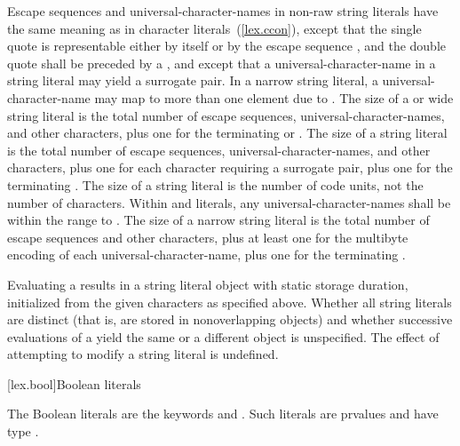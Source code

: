 \pnum
{}%
Escape sequences and universal-character-names in non-raw string literals
have the same meaning as in character literals~(\ref{lex.ccon}), except that
the single quote  is representable either by itself or by the escape sequence
, and the double quote  shall be preceded by a
\tcode{\textbackslash},
and except that a universal-character-name in a
 string literal may yield a surrogate pair.
%
In a narrow string literal, a universal-character-name may map to more
than one  element due to . The
size of a  or wide string literal is the total number of
escape sequences, universal-character-names, and other characters, plus
one for the terminating  or
. The size of a  string
literal is the total number of escape sequences,
universal-character-names, and other characters, plus one for each
character requiring a surrogate pair, plus one for the terminating
. \enternote The size of a 
string literal is the number of code units, not the number of
characters. \exitnote Within  and 
literals, any universal-character-names shall be within the range
 to . The size of a narrow string literal is
the total number of escape sequences and other characters, plus at least
one for the multibyte encoding of each universal-character-name, plus
one for the terminating .

\pnum
Evaluating a  results in a string literal object
with static storage duration, initialized from the given characters as
specified above.
%
Whether all string literals are distinct (that is, are stored in
nonoverlapping objects) and whether successive evaluations of a
 yield the same or a different object is
unspecified.
\enternote
{}%
The effect of attempting to modify a string literal is undefined. \exitnote

[lex.bool]{Boolean literals}

%
\begin{bnf}
\br
    \br
\end{bnf}

\pnum
{}%
The Boolean literals are the keywords  and .
Such literals are prvalues and have type .

